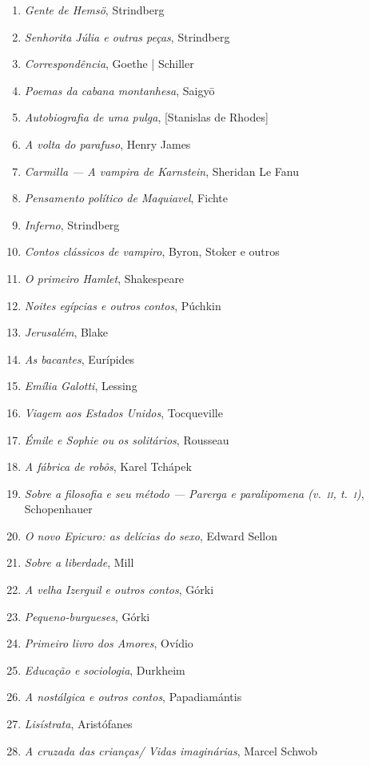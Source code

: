 \begin{enumerate}
\item \textit{Gente de Hemsö}, Strindberg 
\item \textit{Senhorita Júlia e outras peças}, Strindberg 
\item \textit{Correspondência}, Goethe | Schiller
\item \textit{Poemas da cabana montanhesa}, Saigy\=o
\item \textit{Autobiografia de uma pulga}, [Stanislas de Rhodes]
\item \textit{A volta do parafuso}, Henry James
\item \textit{Carmilla --- A vampira de Karnstein}, Sheridan Le Fanu
\item \textit{Pensamento político de Maquiavel}, Fichte
\item \textit{Inferno}, Strindberg
\item \textit{Contos clássicos de vampiro}, Byron, Stoker e outros
\item \textit{O primeiro Hamlet}, Shakespeare
\item \textit{Noites egípcias e outros contos}, Púchkin
\item \textit{Jerusalém}, Blake
\item \textit{As bacantes}, Eurípides
\item \textit{Emília Galotti}, Lessing
\item \textit{Viagem aos Estados Unidos}, Tocqueville
\item \textit{Émile e Sophie ou os solitários}, Rousseau 
\item \textit{A fábrica de robôs}, Karel Tchápek 
\item \textit{Sobre a filosofia e seu método --- Parerga e paralipomena (v.~\textsc{ii}, t.~\textsc{i})}, Schopenhauer 
\item \textit{O novo Epicuro: as delícias do sexo}, Edward Sellon
\item \textit{Sobre a liberdade}, Mill
\item \textit{A velha Izerguil e outros contos}, Górki
\item \textit{Pequeno-burgueses}, Górki
\item \textit{Primeiro livro dos Amores}, Ovídio
\item \textit{Educação e sociologia}, Durkheim
\item \textit{A nostálgica e outros contos}, Papadiamántis 
\item \textit{Lisístrata}, Aristófanes 
\item \textit{A cruzada das crianças/ Vidas imaginárias}, Marcel Schwob

\end{enumerate}
